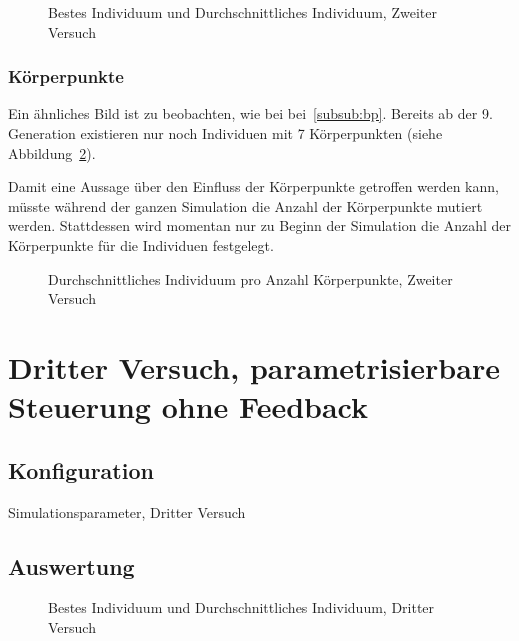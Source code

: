         \begin{figure}
          
          \caption{Bestes Individuum und Durchschnittliches Individuum, Zweiter Versuch\label{fig:graphSecond}}
        \end{figure}

      \subsubsection{Körperpunkte}

        Ein ähnliches Bild ist zu beobachten, wie bei bei~\ref{subsub:bp}.
        Bereits ab der 9\@. Generation existieren nur noch Individuen mit 7 Körperpunkten (siehe Abbildung~\ref{fig:graphBpSecond}).

        Damit eine Aussage über den Einfluss der Körperpunkte getroffen werden kann,
        müsste während der ganzen Simulation die Anzahl der Körperpunkte mutiert werden.
        Stattdessen wird momentan nur zu Beginn der Simulation die Anzahl der Körperpunkte für die Individuen festgelegt.

        \begin{figure}
          
          \caption{Durchschnittliches Individuum pro Anzahl Körperpunkte, Zweiter Versuch\label{fig:graphBpSecond}}
        \end{figure}

    \section{Dritter Versuch, parametrisierbare Steuerung ohne Feedback}

      \subsection{Konfiguration}

        \begin{table}[H]
          
          \caption{Simulationsparameter, Dritter Versuch}
        \end{table}

      \subsection{Auswertung}



        \begin{figure}
          
          \caption{Bestes Individuum und Durchschnittliches Individuum, Dritter Versuch\label{fig:graphThird}}
        \end{figure}


